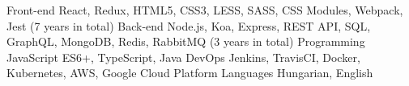 

\begin{cvskills}

  \cvskill
    {Front-end} %
    {React, Redux, HTML5, CSS3, LESS, SASS, CSS Modules, Webpack, Jest (7 years in total)} %
  \cvskill
    {Back-end} %
    {Node.js, Koa, Express, REST API, SQL, GraphQL, MongoDB, Redis, RabbitMQ (3 years in total)} %
  \cvskill
    {Programming} %
    {JavaScript ES6+, TypeScript, Java} %
  \cvskill
    {DevOps} %
    {Jenkins, TravisCI, Docker, Kubernetes, AWS, Google Cloud Platform} %
  \cvskill
    {Languages} %
    {Hungarian, English} %

\end{cvskills}
